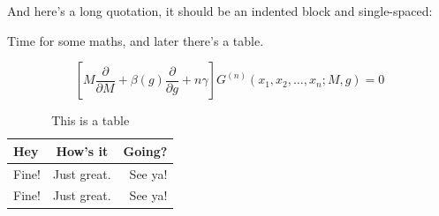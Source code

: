 And here's a long quotation, it should be an indented block and single-spaced:

\begin{quote}
\lipsum[5-6]
\end{quote}

Time for some maths, and later there's a table.

\begin{equation}
\left[M\frac{\partial }{\partial M}+\beta(g)\frac{\partial }{\partial g}+n\gamma\right] G^{(n)}(x_1,x_2,\ldots,x_n;M,g)=0
\end{equation}

\begin{table}[hbt!]
\caption{This is a table}
\centering
\begin{tabular}{ l c r }
\hline
Hey & How's it & Going?\\ \hline
Fine! & Just great. & See ya!\\
Fine! & Just great. & See ya!\\
\hline
\end{tabular}

\end{table}

\lipsum[7]